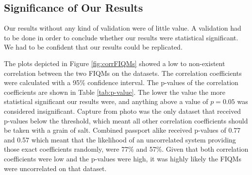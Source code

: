 \subsection{Significance of Our Results}
Our results without any kind of validation were of little value. A validation had to be done in order to conclude whether our results were statistical significant. We had to be confident that our results could be replicated. 

The plots depicted in Figure \ref{fig:corrFIQMs} showed a low to non-existent correlation between the two FIQMs on the datasets. The correlation coefficients were calculated with a 95\% confidence interval. The p-values of the correlation coefficients are shown in Table \ref{tab:p-value}. The lower the value the more statistical significant our results were, and anything above a value of $p = 0.05$ was considered insignificant. Capture from photo was the only dataset that received p-values below the threshold, which meant all other correlation coefficients should be taken with a grain of salt. Combined passport alike received p-values of 0.77 and 0.57 which meant that the likelihood of an uncorrelated system providing those exact coefficients randomly, were 77\% and 57\%. Given that both correlation coefficients were low and the p-values were high, it was highly likely the FIQMs were uncorrelated on that dataset. 

